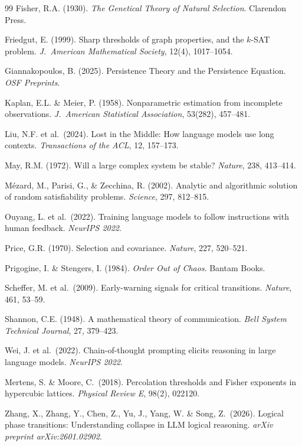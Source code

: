 \documentclass[11pt,a4paper]{article}
\begin{document}
\begin{thebibliography}{99}
Fisher, R.A. (1930).
\emph{The Genetical Theory of Natural Selection}.
Clarendon Press.

Friedgut, E. (1999).
Sharp thresholds of graph properties, and the $k$-SAT problem.
\emph{J.\ American Mathematical Society}, 12(4), 1017--1054.

Giannakopoulos, B. (2025).
Persistence Theory and the Persistence Equation.
\emph{OSF Preprints}.

Kaplan, E.L. \& Meier, P. (1958).
Nonparametric estimation from incomplete observations.
\emph{J.\ American Statistical Association}, 53(282), 457--481.

Liu, N.F. et al.\ (2024).
Lost in the Middle: How language models use long contexts.
\emph{Transactions of the ACL}, 12, 157--173.

May, R.M. (1972).
Will a large complex system be stable?
\emph{Nature}, 238, 413--414.

M\'{e}zard, M., Parisi, G., \& Zecchina, R. (2002).
Analytic and algorithmic solution of random satisfiability problems.
\emph{Science}, 297, 812--815.

Ouyang, L. et al.\ (2022).
Training language models to follow instructions with human feedback.
\emph{NeurIPS 2022}.

Price, G.R. (1970).
Selection and covariance.
\emph{Nature}, 227, 520--521.

Prigogine, I. \& Stengers, I. (1984).
\emph{Order Out of Chaos}.
Bantam Books.

Scheffer, M. et al.\ (2009).
Early-warning signals for critical transitions.
\emph{Nature}, 461, 53--59.

Shannon, C.E. (1948).
A mathematical theory of communication.
\emph{Bell System Technical Journal}, 27, 379--423.

Wei, J. et al.\ (2022).
Chain-of-thought prompting elicits reasoning in large language models.
\emph{NeurIPS 2022}.

Mertens, S. \& Moore, C.\ (2018).
Percolation thresholds and Fisher exponents in hypercubic lattices.
\emph{Physical Review E}, 98(2), 022120.

Zhang, X., Zhang, Y., Chen, Z., Yu, J., Yang, W. \& Song, Z.\ (2026).
Logical phase transitions: Understanding collapse in LLM logical reasoning.
\emph{arXiv preprint arXiv:2601.02902}.


\end{thebibliography}
\end{document}

